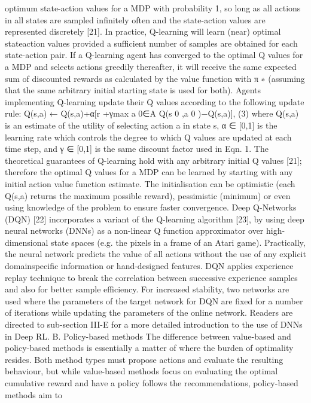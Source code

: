 optimum state-action values for a MDP with probability 1,
so long as all actions in all states are sampled infinitely
often and the state-action values are represented discretely
[21]. In practice, Q-learning will learn (near) optimal stateaction values provided a sufficient number of samples are
obtained for each state-action pair. If a Q-learning agent has
converged to the optimal Q values for a MDP and selects
actions greedily thereafter, it will receive the same expected
sum of discounted rewards as calculated by the value function
with π
∗
(assuming that the same arbitrary initial starting state
is used for both). Agents implementing Q-learning update their
Q values according to the following update rule:
Q(s,a) ← Q(s,a)+α[r +γmax
a
0∈A
Q(s
0
,a
0
)−Q(s,a)], (3)
where Q(s,a) is an estimate of the utility of selecting action
a in state s, α ∈ [0,1] is the learning rate which controls the
degree to which Q values are updated at each time step, and
γ ∈ [0,1] is the same discount factor used in Eqn. 1. The
theoretical guarantees of Q-learning hold with any arbitrary
initial Q values [21]; therefore the optimal Q values for a MDP
can be learned by starting with any initial action value function
estimate. The initialisation can be optimistic (each Q(s,a)
returns the maximum possible reward), pessimistic (minimum)
or even using knowledge of the problem to ensure faster
convergence. Deep Q-Networks (DQN) [22] incorporates a
variant of the Q-learning algorithm [23], by using deep neural
networks (DNNs) as a non-linear Q function approximator
over high-dimensional state spaces (e.g. the pixels in a frame
of an Atari game). Practically, the neural network predicts the
value of all actions without the use of any explicit domainspecific information or hand-designed features. DQN applies
experience replay technique to break the correlation between
successive experience samples and also for better sample
efficiency. For increased stability, two networks are used where
the parameters of the target network for DQN are fixed for
a number of iterations while updating the parameters of the
online network. Readers are directed to sub-section III-E for
a more detailed introduction to the use of DNNs in Deep RL.
B. Policy-based methods
The difference between value-based and policy-based methods is essentially a matter of where the burden of optimality
resides. Both method types must propose actions and evaluate
the resulting behaviour, but while value-based methods focus
on evaluating the optimal cumulative reward and have a policy
follows the recommendations, policy-based methods aim to

